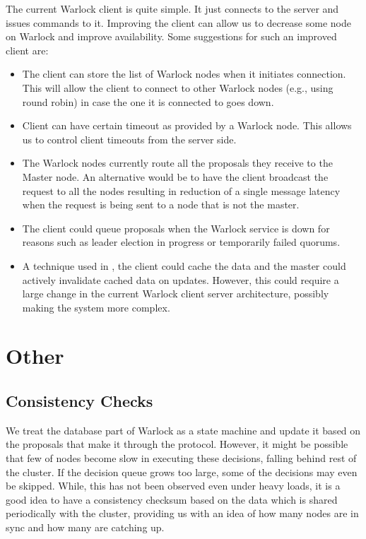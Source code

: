 The current Warlock client is quite simple. It just connects to the server and
issues commands to it. Improving the client can allow us to decrease some
node on Warlock and improve availability. Some suggestions for such an improved
client are:

\begin{itemize}
  \item The client can store the list of Warlock nodes when it initiates
    connection. This will allow the client to connect to other Warlock nodes
    (e.g., using round robin) in case the one it is connected to goes down.
  \item Client can have certain timeout as provided by a Warlock node. This 
    allows us to control client timeouts from the server side.
  \item The Warlock nodes currently route all the proposals they receive to the
    Master node. An alternative would be to have the client broadcast the
    request to all the nodes resulting in reduction of a single message latency
    when the request is being sent to a node that is not the master.
  \item The client could queue proposals when the Warlock service is down for
    reasons such as leader election in progress or temporarily failed quorums.
  \item A technique used in \citet{Burrows06}, the client could cache the data
    and the master could actively invalidate cached data on updates. However,
    this could require a large change in the current Warlock client server
    architecture, possibly making the system more complex.
\end{itemize}

\section{Other}

\subsection{Consistency Checks}

We treat the database part of Warlock as a state machine and update it based
on the proposals that make it through the protocol. However, it
might be possible that few of nodes become slow in executing
these decisions, falling behind
rest of the cluster. If the decision queue grows too large, some of the
decisions may even be skipped. While, this has not been observed even under
heavy loads, it is a good idea to have a consistency checksum based on the data
which is shared periodically with the cluster, providing us with an idea of
how many nodes are in sync and how many are catching up.

